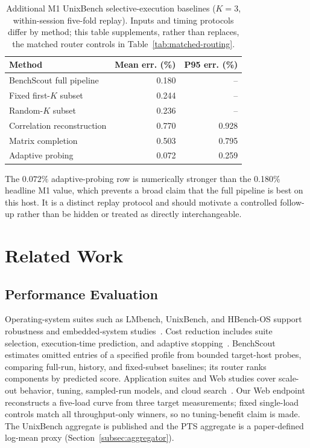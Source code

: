 \documentclass[sigconf, review, anonymous, balance=false]{acmart}
\begin{document}
\begin{table}[t]
\centering
\caption{Additional M1 UnixBench selective-execution baselines ($K=3$, within-session five-fold replay). Inputs and timing protocols differ by method; this table supplements, rather than replaces, the matched router controls in Table~\ref{tab:matched-routing}.}
\label{tab:m1-strong-baselines}
\small
\setlength{\tabcolsep}{4pt}
\begin{tabular}{lrr}
\toprule
\textbf{Method} & \textbf{Mean err. (\%)} & \textbf{P95 err. (\%)} \\
\midrule
BenchScout full pipeline & 0.180 & -- \\
Fixed first-$K$ subset & 0.244 & -- \\
Random-$K$ subset & 0.236 & -- \\
Correlation reconstruction & 0.770 & 0.928 \\
Matrix completion & 0.503 & 0.795 \\
Adaptive probing & 0.072 & 0.259 \\
\bottomrule
\end{tabular}
\end{table}

The $0.072\%$ adaptive-probing row is numerically stronger than the 0.180\% headline M1 value, which prevents a broad claim that the full pipeline is best on this host. It is a distinct replay protocol and should motivate a controlled follow-up rather than be hidden or treated as directly interchangeable.

\section{Related Work}
\subsection{Performance Evaluation}
Operating-system suites such as LMbench, UnixBench, and HBench-OS support robustness and embedded-system studies~\cite{brown1997operating,smith2011byte,hatt2007benchmarking,koopman1997comparing,kanoun2006dependability,garre2014performance,watfa2014benchmarking,silva2019operating}. Cost reduction includes suite selection, execution-time prediction, and adaptive stopping~\cite{Infantolino2014SelectingBenchmark,Saavedra1996AnalysisBenchmark,Mittal2023AdaptiveStopping}. BenchScout estimates omitted entries of a specified profile from bounded target-host probes, comparing full-run, history, and fixed-subset baselines; its router ranks components by predicted score. Application suites and Web studies cover scale-out behavior, tuning, sampled-run models, and cloud search~\cite{ferdman2012clearing,gan2019deathstarbench,chung2004webtuning,venkataraman2016ernest,alipourfard2017cherrypick,voegele2018wessbas}. Our Web endpoint reconstructs a five-load curve from three target measurements; fixed single-load controls match all throughput-only winners, so no tuning-benefit claim is made. The UnixBench aggregate is published and the PTS aggregate is a paper-defined log-mean proxy (Section~\ref{subsec:aggregator}).
\end{document}
